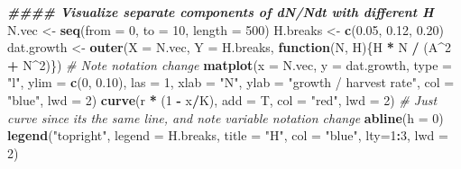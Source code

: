 \documentclass[
]{book}
\newenvironment{Shaded}{\begin{snugshade}}{\end{snugshade}}
\newcommand{\AttributeTok}[1]{\textcolor[rgb]{0.13,0.29,0.53}{#1}}
\newcommand{\CommentTok}[1]{\textcolor[rgb]{0.56,0.35,0.01}{\textit{#1}}}
\newcommand{\ControlFlowTok}[1]{\textcolor[rgb]{0.13,0.29,0.53}{\textbf{#1}}}
\newcommand{\DecValTok}[1]{\textcolor[rgb]{0.00,0.00,0.81}{#1}}
\newcommand{\DocumentationTok}[1]{\textcolor[rgb]{0.56,0.35,0.01}{\textbf{\textit{#1}}}}
\newcommand{\FloatTok}[1]{\textcolor[rgb]{0.00,0.00,0.81}{#1}}
\newcommand{\FunctionTok}[1]{\textcolor[rgb]{0.13,0.29,0.53}{\textbf{#1}}}
\newcommand{\NormalTok}[1]{#1}
\newcommand{\OtherTok}[1]{\textcolor[rgb]{0.56,0.35,0.01}{#1}}
\newcommand{\SpecialCharTok}[1]{\textcolor[rgb]{0.81,0.36,0.00}{\textbf{#1}}}
\newcommand{\StringTok}[1]{\textcolor[rgb]{0.31,0.60,0.02}{#1}}
\begin{document}
\begin{Shaded}
\begin{Highlighting}[]
\DocumentationTok{\#\#\#\# Visualize separate components of dN/Ndt with different H}
\NormalTok{N.vec }\OtherTok{\textless{}{-}} \FunctionTok{seq}\NormalTok{(}\AttributeTok{from =} \DecValTok{0}\NormalTok{, }\AttributeTok{to =} \DecValTok{10}\NormalTok{, }\AttributeTok{length =} \DecValTok{500}\NormalTok{)}
\NormalTok{H.breaks }\OtherTok{\textless{}{-}} \FunctionTok{c}\NormalTok{(}\FloatTok{0.05}\NormalTok{, }\FloatTok{0.12}\NormalTok{, }\FloatTok{0.20}\NormalTok{)}
\NormalTok{dat.growth }\OtherTok{\textless{}{-}} \FunctionTok{outer}\NormalTok{(}\AttributeTok{X =}\NormalTok{ N.vec, }\AttributeTok{Y =}\NormalTok{ H.breaks,}
                    \ControlFlowTok{function}\NormalTok{(N, H)\{H }\SpecialCharTok{*}\NormalTok{ N }\SpecialCharTok{/}\NormalTok{ (A}\SpecialCharTok{\^{}}\DecValTok{2} \SpecialCharTok{+}\NormalTok{ N}\SpecialCharTok{\^{}}\DecValTok{2}\NormalTok{)\}) }\CommentTok{\# Note notation change}
\FunctionTok{matplot}\NormalTok{(}\AttributeTok{x =}\NormalTok{ N.vec, }\AttributeTok{y =}\NormalTok{ dat.growth, }\AttributeTok{type =} \StringTok{"l"}\NormalTok{, }\AttributeTok{ylim =} \FunctionTok{c}\NormalTok{(}\DecValTok{0}\NormalTok{, }\FloatTok{0.10}\NormalTok{), }\AttributeTok{las =} \DecValTok{1}\NormalTok{, }
        \AttributeTok{xlab =} \StringTok{"N"}\NormalTok{, }\AttributeTok{ylab =} \StringTok{"growth / harvest rate"}\NormalTok{, }\AttributeTok{col =} \StringTok{"blue"}\NormalTok{, }\AttributeTok{lwd =} \DecValTok{2}\NormalTok{)}
\FunctionTok{curve}\NormalTok{(r }\SpecialCharTok{*}\NormalTok{ (}\DecValTok{1} \SpecialCharTok{{-}}\NormalTok{ x}\SpecialCharTok{/}\NormalTok{K), }\AttributeTok{add =}\NormalTok{ T, }\AttributeTok{col =} \StringTok{"red"}\NormalTok{, }\AttributeTok{lwd =} \DecValTok{2}\NormalTok{) }\CommentTok{\# Just curve since its the same line, and note variable notation change}
\FunctionTok{abline}\NormalTok{(}\AttributeTok{h =} \DecValTok{0}\NormalTok{)}
\FunctionTok{legend}\NormalTok{(}\StringTok{"topright"}\NormalTok{, }\AttributeTok{legend =}\NormalTok{ H.breaks, }\AttributeTok{title =} \StringTok{"H"}\NormalTok{, }\AttributeTok{col =} \StringTok{"blue"}\NormalTok{, }\AttributeTok{lty=}\DecValTok{1}\SpecialCharTok{:}\DecValTok{3}\NormalTok{, }\AttributeTok{lwd =} \DecValTok{2}\NormalTok{)}
\end{Highlighting}
\end{Shaded}
\end{document}
